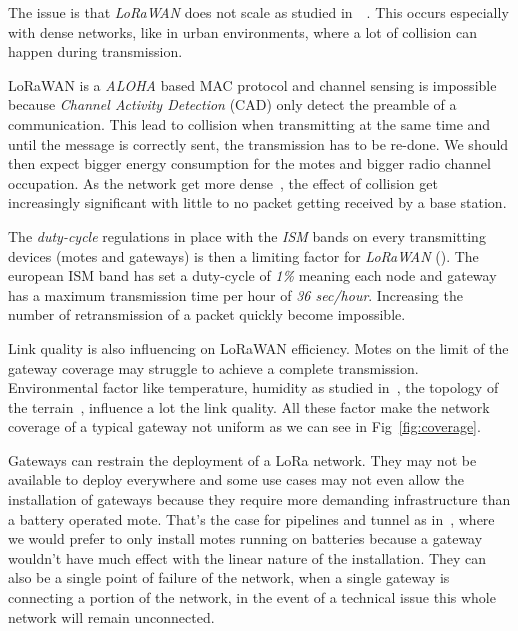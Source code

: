 

The issue is that \emph{LoRaWAN} does not scale as studied 
in~\cite{8030482}~\cite{10.1145/2988287.2989163}. This occurs especially 
with dense networks, like in urban environments, where a lot of collision can
happen during transmission.

LoRaWAN is a \emph{ALOHA} based MAC protocol and channel sensing is impossible 
because \emph{Channel Activity Detection} (CAD) only detect the preamble of a 
communication. %
This lead to collision when transmitting at the same time and until the message 
is correctly sent, the transmission has to be re-done.
We should then expect bigger energy consumption for the motes and bigger radio 
channel occupation.
As the network get more dense~\cite{8030482}, the effect of collision get 
increasingly significant with little to no packet getting received by a base
station.

The \emph{duty-cycle} regulations in place with the \emph{ISM} bands on every
transmitting devices (motes and gateways) is then a limiting factor 
for \emph{LoRaWAN} (\cite{8030482}).
The european ISM band has set a duty-cycle of \emph{1\%} meaning each node 
and gateway has a maximum transmission time per hour of \emph{36 sec/hour}. 
Increasing the number of retransmission of a packet quickly become impossible.

Link quality is also influencing on LoRaWAN efficiency. 
Motes on the limit of the gateway coverage may struggle to achieve a
complete transmission. 
Environmental factor like temperature, humidity as studied 
in~\cite{evaluation_of_the_reliability_of_lora}, the topology of the 
terrain~\cite{lorajambalaya}, influence a lot the link quality.
All these factor make the network coverage of a typical gateway not uniform 
as we can see in Fig~\ref{fig:coverage}.

Gateways can restrain the deployment of a LoRa network.
They may not be available to deploy everywhere and some use cases may not even allow
the installation of gateways because they require more demanding infrastructure 
than a battery operated mote.
That's the case for pipelines and tunnel as in~\cite{Abrardo_2019},
where we would prefer to only install motes running on batteries because a
gateway wouldn't have much effect with the linear nature of the installation.
They can also be a single point of failure of the network, when a single
gateway is connecting a portion of the network, in the event of a technical
issue this whole network will remain unconnected.

